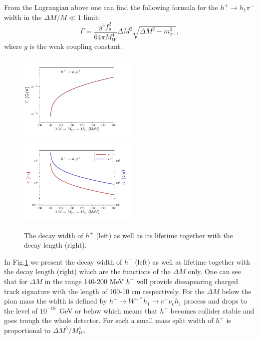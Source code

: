 \documentclass[12pt,a4paper]{article}
\begin{document}
{From the  Lagrangian above one can find 
the following formula
for the $h^+ \to  h_1 \pi^-$ width in the $\Delta M/M\ll 1$
limit:
\begin{equation}
\Gamma=\frac{g^4 f_{\pi}^2}{64 \pi M_W^4}
\Delta M^2\sqrt{\Delta M^2-m_{\pi^+}^2},
\end{equation}
where $g$ is the weak coupling constant.
\begin{figure}[htb]
  \includegraphics[width=0.5\textwidth]{gamma.pdf}%
  \includegraphics[width=0.5\textwidth]{lifetime.pdf}%
  \caption{ The decay width of $h^+$ (left) as well as its lifetime together with the decay length (right).
  }
  \label{fig:gamma}
\end{figure}
In Fig.\ref{fig:gamma} we present the decay width  of $h^+$ (left) as well as lifetime together with the decay length (right)
which are the functions of the $\Delta M$ only. One can see that for $\Delta M$ in the range 140-200 MeV
$h^+$ will provide dissapearing charged track signature with the length of 100-10 cm respectively.
For the $\Delta M$ below the pion mass the width is defined by $h^+\to W^{+*}h_1 \to e^+\nu_e h_1$
process and drops to the level of $10^{-18}$~GeV or below
which means that $h^+$ becomes collider stable
and goes trough the whole detector. For such a small mass split 
width of  $h^+$ is proportional to  $\Delta M^5/M_W^4$.

}
\end{document}
